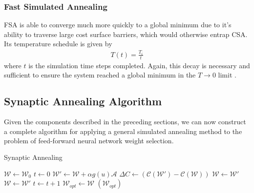 \documentclass[10pt,journal,cspaper,compsoc]{IEEEtran}
\begin{document}
\subsubsection{Fast Simulated Annealing}
FSA is able to converge much more quickly to a global minimum due to it's ability to traverse large cost surface barriers, which would otherwise entrap CSA. Its temperature schedule is given by
\begin{align}
T(t) = \frac{T_i}{t}
\end{align}
\noindent where $t$ is the simulation time steps completed. Again, this decay is necessary and sufficient to ensure the system reached a global minimum in the $T \rightarrow 0$ limit \cite{szu1987fastsimulatedannealing}. 



\subsection{Synaptic Annealing Algorithm}

Given the components described in the preceding sections, we can now construct a complete algorithm for applying a general simulated annealing method to the problem of feed-forward neural network weight selection.

\begin{algorithm}
	\caption{Synaptic Annealing}
	\label{alg:synaptic annealing}
	\begin{algorithmic}
		\STATE $\boldsymbol{\mathcal{W}} \leftarrow \boldsymbol{\mathcal{W}}_0$
		\STATE $t \leftarrow 0$
			\STATE $\boldsymbol{\mathcal{W}}' \leftarrow \boldsymbol{\mathcal{W}} + \alpha g(u) \boldsymbol{\mathcal{A}} $
			\STATE $\Delta C \leftarrow (\mathcal{C}(\boldsymbol{\mathcal{W}}')-\mathcal{C}(\boldsymbol{\mathcal{W}}))$
				\STATE $\boldsymbol{\mathcal{W}} \leftarrow \boldsymbol{\mathcal{W}}'$
				\STATE $\boldsymbol{\mathcal{W}} \leftarrow \boldsymbol{\mathcal{W}}'$
			\ENDIF
			\STATE $t \leftarrow t+1$
		\ENDWHILE
		\STATE $\boldsymbol{\mathcal{W}}_{opt} \leftarrow \boldsymbol{\mathcal{W}}$
		\RETURN $(\boldsymbol{\mathcal{W}}_{opt})$
	\end{algorithmic}
\end{algorithm}
\end{document}
